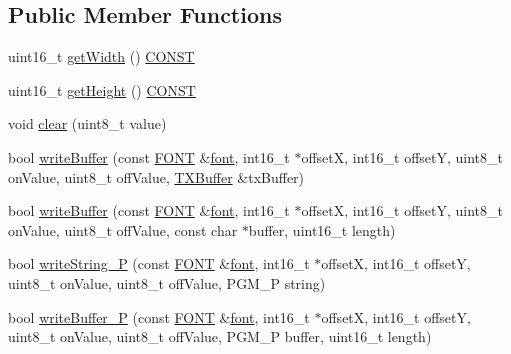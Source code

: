 \subsection*{Public Member Functions}
\begin{DoxyCompactItemize}
\item 
uint16\-\_\-t \hyperlink{classmhvlib_1_1_display___monochrome_ae9a93433845d08dd03518b96b624a4fe}{get\-Width} () \hyperlink{io_8h_a0c33b494a68ce28497e7ce8e5e95feff}{C\-O\-N\-S\-T}
\item 
uint16\-\_\-t \hyperlink{classmhvlib_1_1_display___monochrome_aab3a2cc9b2c1f23de5b8df0f66e94759}{get\-Height} () \hyperlink{io_8h_a0c33b494a68ce28497e7ce8e5e95feff}{C\-O\-N\-S\-T}
\item 
void \hyperlink{classmhvlib_1_1_display___monochrome_afa8204a15201104409812b7f1d44cc04}{clear} (uint8\-\_\-t value)
\item 
bool \hyperlink{classmhvlib_1_1_display___monochrome_a3ab8cc765a62f4d1809cb5b02411c9c1}{write\-Buffer} (const \hyperlink{namespacemhvlib_ac8cf789cdad5097b81a2d75dc08e6bfc}{F\-O\-N\-T} \&\hyperlink{structmhvlib_1_1font}{font}, int16\-\_\-t $\ast$offset\-X, int16\-\_\-t offset\-Y, uint8\-\_\-t on\-Value, uint8\-\_\-t off\-Value, \hyperlink{classmhvlib_1_1_t_x_buffer}{T\-X\-Buffer} \&tx\-Buffer)
\item 
bool \hyperlink{classmhvlib_1_1_display___monochrome_a831bc57dfb0ae9daf1f3fad21e0d8c42}{write\-Buffer} (const \hyperlink{namespacemhvlib_ac8cf789cdad5097b81a2d75dc08e6bfc}{F\-O\-N\-T} \&\hyperlink{structmhvlib_1_1font}{font}, int16\-\_\-t $\ast$offset\-X, int16\-\_\-t offset\-Y, uint8\-\_\-t on\-Value, uint8\-\_\-t off\-Value, const char $\ast$buffer, uint16\-\_\-t length)
\item 
bool \hyperlink{classmhvlib_1_1_display___monochrome_ab25d3accb4d2e0ee9352d8479a44985c}{write\-String\-\_\-\-P} (const \hyperlink{namespacemhvlib_ac8cf789cdad5097b81a2d75dc08e6bfc}{F\-O\-N\-T} \&\hyperlink{structmhvlib_1_1font}{font}, int16\-\_\-t $\ast$offset\-X, int16\-\_\-t offset\-Y, uint8\-\_\-t on\-Value, uint8\-\_\-t off\-Value, P\-G\-M\-\_\-\-P string)
\item 
bool \hyperlink{classmhvlib_1_1_display___monochrome_a7ce03c21ea75a8bd68413e94f105a784}{write\-Buffer\-\_\-\-P} (const \hyperlink{namespacemhvlib_ac8cf789cdad5097b81a2d75dc08e6bfc}{F\-O\-N\-T} \&\hyperlink{structmhvlib_1_1font}{font}, int16\-\_\-t $\ast$offset\-X, int16\-\_\-t offset\-Y, uint8\-\_\-t on\-Value, uint8\-\_\-t off\-Value, P\-G\-M\-\_\-\-P buffer, uint16\-\_\-t length)
\item 

\end{DoxyCompactItemize}
